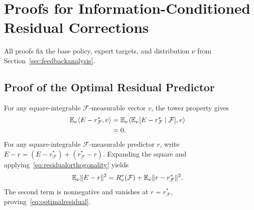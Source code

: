 \section{Proofs for Information-Conditioned Residual Corrections}
\label{app:feedbackproofs}
All proofs fix the base policy, expert targets, and distribution $\nu$ from Section~\ref{sec:feedbackanalysis}.

\subsection{Proof of the Optimal Residual Predictor}
\label{app:optimalresidual}
For any square-integrable $\mathcal F$-measurable vector $v$, the tower property gives
\begin{equation}
 \begin{aligned}
 \mathbb E_\nu\langle E-r_{\mathcal F}^*,v\rangle
 &=\mathbb E_\nu\langle\mathbb E_\nu[E-r_{\mathcal F}^*\mid\mathcal F],v\rangle\\
 &=0.
 \end{aligned}
 \label{eq:residualorthogonality}
\end{equation}
For any square-integrable $\mathcal F$-measurable predictor $r$, write
$E-r=(E-r_{\mathcal F}^*)+(r_{\mathcal F}^*-r)$.
Expanding the square and applying~\eqref{eq:residualorthogonality} yields
\begin{equation}
 \mathbb E_\nu\lVert E-r\rVert^2
 =R_\nu^*(\mathcal F)+\mathbb E_\nu\lVert r-r_{\mathcal F}^*\rVert^2.
 \label{eq:residualprojection}
\end{equation}
The second term is nonnegative and vanishes at $r=r_{\mathcal F}^*$, proving~\eqref{eq:optimalresidual}.


